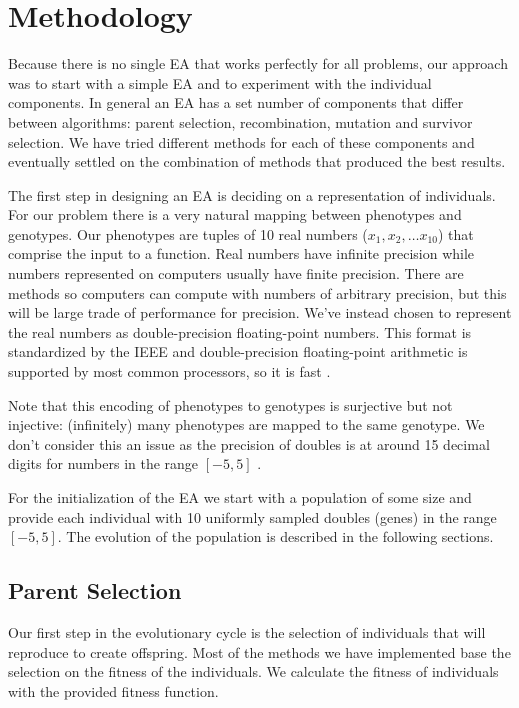 \section{Methodology}\label{sec:methodology}
Because there is no single EA that works perfectly for all problems, our approach was to start with
a simple EA and to experiment with the individual components. In general an EA has a set number of
components that differ between algorithms: parent selection, recombination, mutation and survivor
selection. We have tried different methods for each of these components and eventually settled on
the combination of methods that produced the best results.

The first step in designing an EA is deciding on a representation of individuals. For our problem
there is a very natural mapping between phenotypes and genotypes. Our phenotypes are tuples of 10
real numbers ($x_1, x_2, \ldots x_{10}$) that comprise the input to a function. Real numbers have
infinite precision while numbers represented on computers usually have finite precision. There are
methods so computers can compute with numbers of arbitrary precision, but this will be large trade
of performance for precision. We've instead chosen to represent the real numbers as double-precision
floating-point numbers. This format is standardized by the IEEE and double-precision floating-point
arithmetic is supported by most common processors, so it is fast \cite{floats}.

Note that this encoding of phenotypes to genotypes is surjective but not injective: (infinitely)
many phenotypes are mapped to the same genotype. We don't consider this an issue as the precision of
doubles is at around 15 decimal digits for numbers in the range $[-5, 5]$ \cite{wiki:floats}.

For the initialization of the EA we start with a population of some size and provide each individual
with 10 uniformly sampled doubles (genes) in the range $[-5, 5]$. The evolution of the population is
described in the following sections.

\subsection{Parent Selection}
Our first step in the evolutionary cycle is the selection of individuals that will reproduce to
create offspring. Most of the methods we have implemented base the selection on the fitness of the
individuals. We calculate the fitness of individuals with the provided fitness function.


